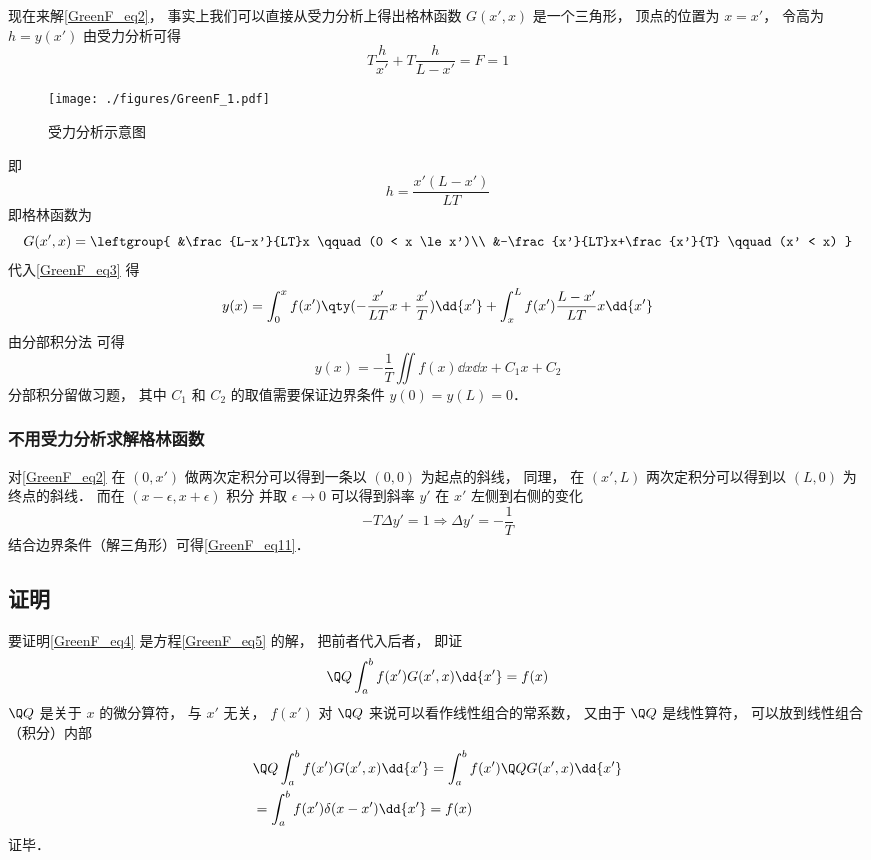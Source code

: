 现在来解\autoref{GreenF_eq2}， 事实上我们可以直接从受力分析上得出格林函数 $G(x', x)$ 是一个三角形， 顶点的位置为 $x = x'$， 令高为 $h = y(x')$ 由受力分析可得
\begin{equation}
T\frac{h}{x'} + T\frac{h}{L - x'} = F = 1
\end{equation}
\begin{figure}[ht]
\centering
\texttt{[image: ./figures/GreenF\_1.pdf]}
\caption{受力分析示意图} \label{GreenF_fig1}
\end{figure}
即
\begin{equation}\label{GreenF_eq11}
h = \frac{x' (L - x')}{LT}
\end{equation}
即格林函数为
\begin{equation}
G(x', x) = \leftgroup{
&\frac{L-x'}{LT}x \qquad (0 < x \le x')\\
&-\frac{x'}{LT}x+\frac{x'}{T} \qquad (x' < x)
}\end{equation}
代入\autoref{GreenF_eq3} 得
\begin{equation}
y(x) = \int_0^x f(x')\qty(-\frac{x'}{LT}x+\frac{x'}{T}) \dd{x'} + \int_x^L f(x')\frac{L-x'}{LT}x \dd{x'}
\end{equation}
由分部积分法 可得
\begin{equation}
y(x) = -\frac{1}{T}\iint f(x)  \dd{x}\dd{x} + C_1 x + C_2
\end{equation}
分部积分留做习题， 其中 $C_1$ 和 $C_2$ 的取值需要保证边界条件 $y(0) = y(L) = 0$．

\subsubsection{不用受力分析求解格林函数}
对\autoref{GreenF_eq2} 在 $(0, x')$ 做两次定积分可以得到一条以 $(0,0)$ 为起点的斜线， 同理， 在 $(x', L)$ 两次定积分可以得到以 $(L, 0)$ 为终点的斜线． 而在 $(x-\epsilon, x+\epsilon)$ 积分 并取 $\epsilon\to 0$ 可以得到斜率 $y'$ 在 $x'$ 左侧到右侧的变化
\begin{equation}
-T\Delta y' = 1 \Longrightarrow \Delta y' = -\frac{1}{T}
\end{equation}
结合边界条件（解三角形）可得\autoref{GreenF_eq11}．

\subsection{证明}
要证明\autoref{GreenF_eq4} 是方程\autoref{GreenF_eq5} 的解， 把前者代入后者， 即证
\begin{equation}
\Q Q \int_a^b f(x') G(x', x) \dd{x'} = f(x)
\end{equation}
$\Q Q$ 是关于 $x$ 的微分算符， 与 $x'$ 无关， $f(x')$ 对 $\Q Q$ 来说可以看作线性组合的常系数， 又由于 $\Q Q$ 是线性算符， 可以放到线性组合（积分）内部
\begin{equation}\label{GreenF_eq6}
\begin{aligned}
&\Q Q \int_a^b f(x') G(x', x) \dd{x'} = \int_a^b f(x') \Q QG(x', x)\dd{x'}\\
&= \int_a^b f(x') \delta(x - x') \dd{x'} = f(x)
\end{aligned}
\end{equation}
证毕．

